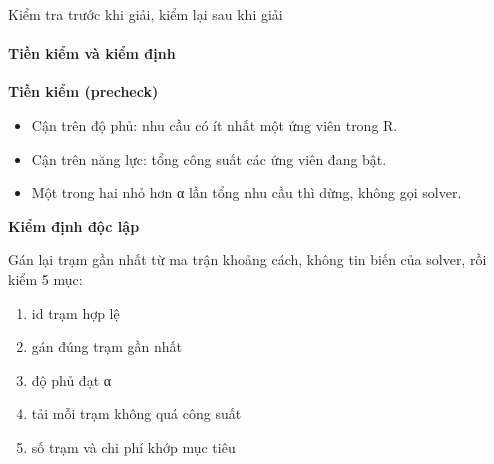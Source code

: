 \documentclass[aspectratio=169, 10pt, t, xcolor=table]{beamer}
\newcommand{\Flead}{\fontsize{8}{11}\selectfont}
\newcommand{\code}[1]{{\ttfamily #1}}
\newcommand{\slidefoot}{}
\newcommand{\sfoot}[1]{\gdef\slidefoot{#1}}
\newenvironment{bul}[1][1.3mm]{\begin{itemize}\setlength{\itemsep}{#1}}{\end{itemize}}
\begin{document}
\sfoot{101 test offline + 15 test Playwright e2e · MILP đối chiếu vét cạn trên 40 bài · CI 2 job (\code{docker-test}, \code{e2e})}
\begin{frame}{Kiểm tra trước khi giải, kiểm lại sau khi giải}
  \framesubtitle{Tiền kiểm và kiểm định}
  \begin{tcbraster}[raster columns=2, raster column skip=4mm]
    \begin{card}[top=3.2mm, bottom=3.2mm, left=4mm, right=4mm, fontupper=\Flead\color{soft}]
      {\fontsize{9.5}{11.5}\selectfont\bfseries\color{ink}Tiền kiểm (precheck)\par}\vspace{1.6mm}
      \begin{bul}[1.6mm]
        \item Cận trên độ phủ: nhu cầu có ít nhất một ứng viên trong R.
        \item Cận trên năng lực: tổng công suất các ứng viên đang bật.
        \item Một trong hai nhỏ hơn α lần tổng nhu cầu thì dừng, không gọi solver.
      \end{bul}
    \end{card}
    \begin{card}[top=3.2mm, bottom=3.2mm, left=4mm, right=4mm, fontupper=\Flead\color{soft}]
      {\fontsize{9.5}{11.5}\selectfont\bfseries\color{ink}Kiểm định độc lập\par}\vspace{1.6mm}
      Gán lại trạm gần nhất từ ma trận khoảng cách, không tin biến của solver, rồi kiểm 5 mục:
      \vspace{1mm}
      \begin{enumerate}\setlength{\itemsep}{0.5mm}
        \item id trạm hợp lệ
        \item gán đúng trạm gần nhất
        \item độ phủ đạt α
        \item tải mỗi trạm không quá công suất
        \item số trạm và chi phí khớp mục tiêu
      \end{enumerate}
    \end{card}
  \end{tcbraster}
\end{frame}
\end{document}
